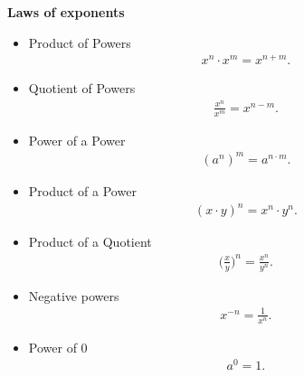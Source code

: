 \documentclass{report}
\begin{document}
      \pagebreak \bigbreak \noindent
      \begin{mdframed}
        \textbf{Laws of exponents}
          \begin{itemize}
            \item Product of Powers
                \begin{align*}
                    x^{n} \cdot x^{m} = x^{n+m}
                .\end{align*}
            \item Quotient of Powers
                \begin{align*}
                    \frac{x^{n}}{x^{m}} = x^{n-m}
                .\end{align*}
            \item Power of a Power
                \begin{align*}
                    (a^{n})^{m} = a^{n \cdot m}
                .\end{align*}
            \item Product of a Power
                \begin{align*}
                    (x \cdot y)^{n} = x^{n} \cdot y^{n}
                .\end{align*}
            \item Product of a Quotient
                \begin{align*}
                    \bigg(\frac{x}{y}\bigg)^{n} = \frac{x^{n}}{y^{n}}
                .\end{align*}
            \item Negative powers
              \begin{align*}
                x^{-n} = \frac{1}{x^{n}}
              .\end{align*}
            \item Power of 0
              \begin{align*}
                a^{0} = 1
              .\end{align*}
          \end{itemize}
      \end{mdframed}
      \bigbreak \noindent 
\end{document}

